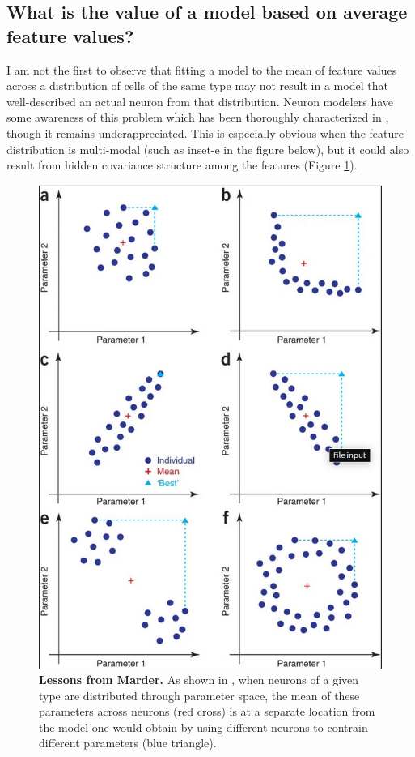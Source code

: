 \subsection{What is the value of a model based on average feature values?}
\label{sec:mean-model}
I am not the first to observe that fitting a model to the mean of feature values across a distribution of cells of the same type may not result in a model that well-described an actual neuron from that distribution.
Neuron modelers have some awareness of this problem which has been thoroughly characterized in \cite{marder2011multiple}, though it remains underappreciated.
This is especially obvious when the feature distribution is multi-modal (such as inset-e in the figure below), but it could also result from hidden covariance structure among the features (Figure \ref{fig:eve_marder}).

\begin{figure}
\begin{center}
\includegraphics[scale=0.65]{figures/eve_marder.png}
\end{center}
\caption[Lessons from Marder]{\textbf{Lessons from Marder.} As shown in \cite{marder2011multiple}, when neurons of a given type are distributed through parameter space, the mean of these parameters across neurons (red cross) is at a separate location from the model one would obtain by using different neurons to contrain different parameters (blue triangle).}
\label{fig:eve_marder}
\end{figure}

